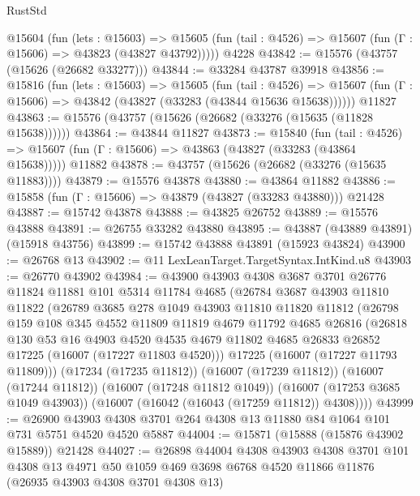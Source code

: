 \begin{lexlean}{RustStd}
\begin{coremodule}
    @15604
      (fun (lets : @15603) =>
      @15605 (fun (tail : @4526) => @15607 (fun (Γ : @15606) => @43823 (@43827 @43792)))))
    @4228
@43842 := @15576 (@43757 (@15626 (@26682 @33277)))
@43844 := @33284 @43787 @39918
@43856 := @15816
    (fun (lets : @15603) =>
    @15605
      (fun (tail : @4526) =>
      @15607 (fun (Γ : @15606) => @43842 (@43827 (@33283 (@43844 @15636 @15638))))))
    @11827
@43863 := @15576 (@43757 (@15626 (@26682 (@33276 (@15635 (@11828 @15638))))))
@43864 := @43844 @11827
@43873 := @15840
    (fun (tail : @4526) => @15607 (fun (Γ : @15606) => @43863 (@43827 (@33283 (@43864 @15638)))))
    @11882
@43878 := @43757 (@15626 (@26682 (@33276 (@15635 @11883))))
@43879 := @15576 @43878
@43880 := @43864 @11882
@43886 := @15858 (fun (Γ : @15606) => @43879 (@43827 (@33283 @43880))) @21428
@43887 := @15742 @43878
@43888 := @43825 @26752
@43889 := @15576 @43888
@43891 := @26755 @33282 @43880
@43895 := @43887 (@43889 @43891) (@15918 @43756)
@43899 := @15742 @43888 @43891 (@15923 @43824)
@43900 := @26768 @13
@43902 := @11 LexLeanTarget.TargetSyntax.IntKind.u8
@43903 := @26770 @43902
@43984 := @43900
    @43903
    @4308
    @3687
    @3701
    @26776
    @11824
    @11881
    @101
    @5314
    @11784
    @4685
    (@26784
      @3687
      @43903
      @11810
      @11822
      (@26789
        @3685
        @278
        @1049
        @43903
        @11810
        @11820
        @11812
        (@26798
          @159
          @108
          @345
          @4552
          @11809
          @11819
          @4679
          @11792
          @4685
          @26816
          (@26818
            @130
            @53
            @16
            @4903
            @4520
            @4535
            @4679
            @11802
            @4685
            @26833
            @26852
            @17225
            (@16007 (@17227 @11803 @4520)))
          @17225
          (@16007 (@17227 @11793 @11809)))
        (@17234 (@17235 @11812))
        (@16007 (@17239 @11812))
        (@16007 (@17244 @11812))
        (@16007 (@17248 @11812 @1049))
        (@16007 (@17253 @3685 @1049 @43903))
        (@16007 (@16042 (@16043 (@17259 @11812)) @4308))))
@43999 := @26900
    @43903
    @4308
    @3701
    @264
    @4308
    @13
    @11880
    @84
    @1064
    @101
    @731
    @5751
    @4520
    @4520
    @5887
@44004 := @15871 (@15888 (@15876 @43902 @15889)) @21428
@44027 := @26898
    @44004
    @4308
    @43903
    @4308
    @3701
    @101
    @4308
    @13
    @4971
    @50
    @1059
    @469
    @3698
    @6768
    @4520
    @11866
    @11876
    (@26935 @43903 @4308 @3701 @4308 @13)

\end{coremodule}
\end{lexlean}
